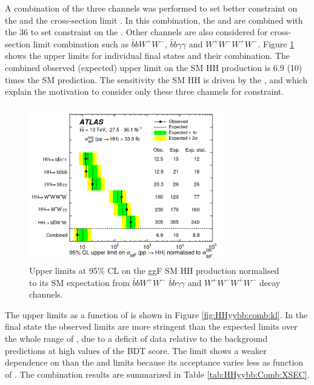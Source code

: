 A combination of the three channels was performed to set better constraint on the \kl and the cross-section limit \cite{HH_Comb_36}. In this combination, the \bbbb and \bbtt are combined with the 36 \ifb \bbyy to set constraint on the \kl. Other channels are also considered for cross-section limit combination such as $\bar{b}bW^+W^-$, $\bar{b}b\gamma\gamma$ and $W^+W^-W^+W^-$. Figure \ref{fig:HHyybb:comb:xsec} shows the upper limits for individual final states and their combination. The combined observed (expected) upper limit on the SM HH production is 6.9 (10) times the SM prediction. The sensitivity the SM HH is driven by the \bbbb, \bbtt and \bbyy which explain the motivation to consider only these three channels for \kl constraint. 
\begin{figure}[htbp]
    \centering
    \includegraphics[width=0.75\textwidth]{Ch1/Img/XSec_Comb_36.png}
    \caption{Upper limits at 95\% CL on the ggF SM HH production normalised to its SM expectation from \bbtt \bbbb \bbyy $\bar{b}bW^+W^-$ $\bar{b}b\gamma\gamma$ and $W^+W^-W^+W^-$ decay channels.}
    \label{fig:HHyybb:comb:xsec}
\end{figure}

The upper limits as a function of \kl is shown in Figure \ref{fig:HHyybb:comb:kl}. In the \bbtt final state the observed limits are more stringent than the expected limits over the whole range of \kl, due to a deficit of data relative to the background predictions at high values of the BDT score. The \bbyy limit shows a weaker dependence on \kl than the \bbbb and \bbtt limits because its acceptance varies less as function of \kl. The combination results are summarized in Table \ref{tab:HHyybb:Comb:XSEC}.

